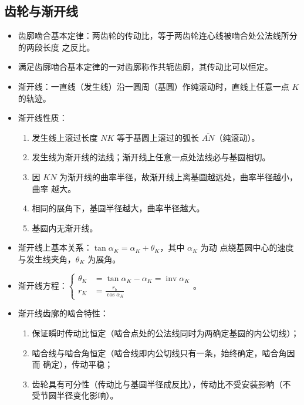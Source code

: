\documentclass[12pt,a4paper]{article}
\newcommand{\tightlist}{\setlength{\parskip}{0pt}\setlength{\itemsep}{0pt}}
\newcommand{\hint}[1]{\textsf{（#1）}}
\DeclareMathOperator{\inv}{inv}
\begin{document}
\subsection{齿轮与渐开线}
\begin{itemize}\tightlist
    \item 齿廓啮合基本定律：两齿轮的传动比，等于两齿轮连心线被啮合处公法线所分的两段长度
    之反比。
    \item 满足齿廓啮合基本定律的一对齿廓称作共轭齿廓，其传动比可以恒定。
    \item 渐开线：一直线\hint{发生线}沿一圆周\hint{基圆}作纯滚动时，直线上任意一点 $K$ 的轨迹。
    \item 渐开线性质：
    \begin{enumerate}\tightlist
        \item 发生线上滚过长度 $NK$ 等于基圆上滚过的弧长 $\overline{AN}$\hint{纯滚动}。
        \item 发生线为渐开线的法线；渐开线上任意一点处法线必与基圆相切。
        \item 因 $KN$ 为渐开线的曲率半径，故渐开线上离基圆越远处，曲率半径越小，曲率
        越大。
        \item 相同的展角下，基圆半径越大，曲率半径越大。
        \item 基圆内无渐开线。
    \end{enumerate}
    \item 渐开线上基本关系：$\tan\alpha_K=\alpha_K+\theta_K$，其中 $\alpha_K$ 为动
    点绕基圆中心的速度与发生线夹角，$\theta_K$ 为展角。
    \item 渐开线方程：$\begin{cases}\theta_K&=\tan\alpha_K-\alpha_K=\inv\alpha_K\\
    r_K&=\frac{r_b}{\cos\alpha_K}\end{cases}$。
    \item 渐开线齿廓的啮合特性：
    \begin{enumerate}\tightlist
        \item 保证瞬时传动比恒定\hint{啮合点处的公法线同时为两确定基圆的内公切线}；
        \item 啮合线与啮合角恒定\hint{啮合线即内公切线只有一条，始终确定，啮合角因而
        确定}，传动平稳；
        \item 齿轮具有可分性\hint{传动比与基圆半径成反比}，传动比不受安装影响\hint{不
        受节圆半径变化影响}。
    \end{enumerate}
\end{itemize}
\end{document}
